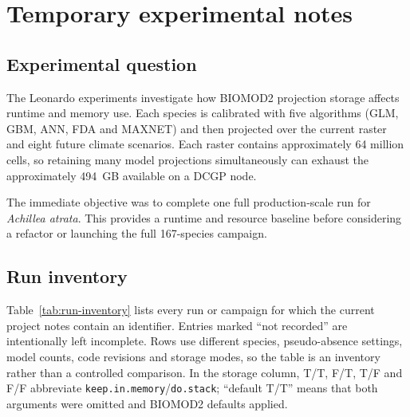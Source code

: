 \chapter{Temporary experimental notes}

\section{Experimental question}

The Leonardo experiments investigate how BIOMOD2 projection storage affects runtime and memory use. Each species is calibrated with five algorithms (GLM, GBM, ANN, FDA and MAXNET) and then projected over the current raster and eight future climate scenarios. Each raster contains approximately 64 million cells, so retaining many model projections simultaneously can exhaust the approximately 494~GB available on a DCGP node.

The immediate objective was to complete one full production-scale run for \emph{Achillea atrata}. This provides a runtime and resource baseline before considering a refactor or launching the full 167-species campaign.

\section{Run inventory}

Table~\ref{tab:run-inventory} lists every run or campaign for which the current project notes contain an identifier. Entries marked ``not recorded'' are intentionally left incomplete. Rows use different species, pseudo-absence settings, model counts, code revisions and storage modes, so the table is an inventory rather than a controlled comparison. In the storage column, T/T, F/T, T/F and F/F abbreviate \texttt{keep.in.memory}/\texttt{do.stack}; ``default T/T'' means that both arguments were omitted and BIOMOD2 defaults applied.

